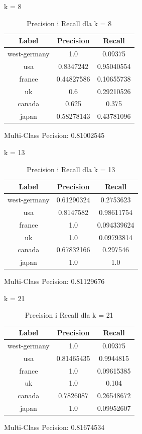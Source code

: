\documentclass{classrep}
\begin{document}
k = 8
\begin{table}[H]
\begin{tabular}{|c|c|c|}
\hline
Label        & Precision  & Recall     \\ \hline
west-germany & 1.0        & 0.09375    \\ \hline
usa          & 0.8347242  & 0.95040554 \\ \hline
france       & 0.44827586 & 0.10655738 \\ \hline
uk           & 0.6        & 0.29210526 \\ \hline
canada       & 0.625      & 0.375      \\ \hline
japan        & 0.58278143 & 0.43781096 \\ \hline
\end{tabular}
\caption{Precision i Recall dla k = 8}
\end{table}
Multi-Class Pecision: 0.81002545

k = 13
\begin{table}[H]
\begin{tabular}{|c|c|c|}
\hline
Label        & Precision  & Recall      \\ \hline
west-germany & 0.61290324 & 0.2753623   \\ \hline
usa          & 0.8147582  & 0.98611754  \\ \hline
france       & 1.0        & 0.094339624 \\ \hline
uk           & 1.0        & 0.09793814  \\ \hline
canada       & 0.67832166 & 0.297546    \\ \hline
japan        & 1.0        & 1.0         \\ \hline
\end{tabular}
\caption{Precision i Recall dla k = 13}
\end{table}
Multi-Class Pecision: 0.81129676

k = 21
\begin{table}[H]
\begin{tabular}{|c|c|c|}
\hline
Label        & Precision  & Recall     \\ \hline
west-germany & 1.0        & 0.09375    \\ \hline
usa          & 0.81465435 & 0.9944815  \\ \hline
france       & 1.0        & 0.09615385 \\ \hline
uk           & 1.0        & 0.104      \\ \hline
canada       & 0.7826087  & 0.26548672 \\ \hline
japan        & 1.0        & 0.09952607 \\ \hline
\end{tabular}
\caption{Precision i Recall dla k = 21}
\end{table}
Multi-Class Pecision: 0.81674534
\end{document}
